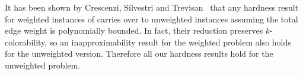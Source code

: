 \begin{remark}
\label{rem:wt-unwt}
  It has been shown by Crescenzi, Silvestri and Trevisan~\cite{CST01}
  that any hardness result for weighted instances of 
  carries over to  unweighted instances {assuming} the
  total edge weight is polynomially bounded. In fact, their reduction
  preserves $k$-colorability, so an inapproximability result for the weighted
   problem also holds for the unweighted version. Therefore
  all our hardness results hold for the unweighted  problem.
\end{remark}
